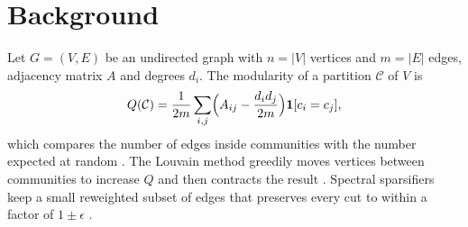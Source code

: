 \chapter{Background}
\label{ch:background}

Let $G = (V, E)$ be an undirected graph with $n = |V|$ vertices and $m = |E|$ edges, adjacency
matrix $A$ and degrees $d_i$. The modularity of a partition $\mathcal{C}$ of $V$ is
\begin{equation}
  Q(\mathcal{C}) = \frac{1}{2m}\sum_{i,j}\Bigl(A_{ij} - \frac{d_i d_j}{2m}\Bigr)
  \mathbf{1}[c_i = c_j],
  \label{eq:modularity}
\end{equation}
which compares the number of edges inside communities with the number expected at random
\citep{newman2006}. The Louvain method greedily moves vertices between communities to
increase $Q$ and then contracts the result \citep{blondel2008}. Spectral sparsifiers keep a
small reweighted subset of edges that preserves every cut to within a factor of $1 \pm
\epsilon$ \citep{spielman2004}.

